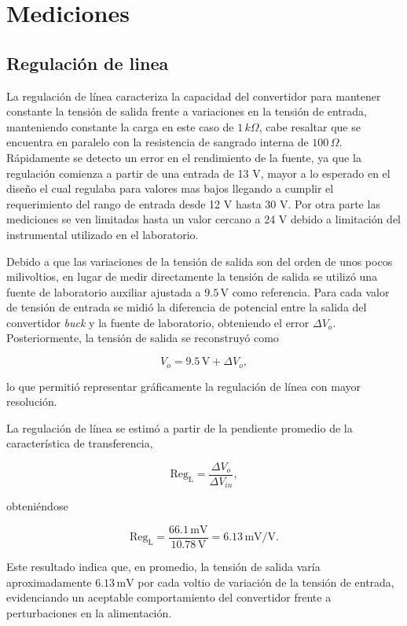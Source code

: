 \documentclass[]{article}
\begin{document}
	
	\section{Mediciones}
	
	\subsection{Regulación de linea}
	
	La regulación de línea caracteriza la capacidad del convertidor para mantener constante la tensión de salida frente a variaciones en la tensión de entrada, manteniendo constante la carga en este caso de $1 \, k\Omega$, cabe resaltar que se encuentra en paralelo con la resistencia de sangrado interna de $100\, \Omega$. Rápidamente se detecto un error en el rendimiento de la fuente, ya que la regulación comienza a partir de una entrada de 13 V, mayor a lo esperado en el diseño el cual regulaba para valores mas bajos llegando a cumplir el requerimiento del rango de entrada desde 12 V hasta 30 V. Por otra parte las mediciones se ven limitadas hasta un valor cercano a 24 V debido a limitación del instrumental utilizado en el laboratorio.
	
	
	
	Debido a que las variaciones de la tensión de salida son del orden de unos pocos milivoltios, en lugar de medir directamente la tensión de salida se utilizó una fuente de laboratorio auxiliar ajustada a $9.5\,\mathrm{V}$ como referencia. Para cada valor de tensión de entrada se midió la diferencia de potencial entre la salida del convertidor \textit{buck} y la fuente de laboratorio, obteniendo el error $\Delta V_o$. Posteriormente, la tensión de salida se reconstruyó como
	
	\[
	V_o = 9.5\,\mathrm{V} + \Delta V_o,
	\]
	
	lo que permitió representar gráficamente la regulación de línea con mayor resolución.
	
	La regulación de línea se estimó a partir de la pendiente promedio de la característica de transferencia,
	
	\[
	\mathrm{Reg}_{\mathrm{L}}=
	\frac{\Delta V_o}{\Delta V_{in}},
	\]
	
	obteniéndose
	
	\[
	\mathrm{Reg}_{\mathrm{L}}
	=
	\frac{66.1\,\mathrm{mV}}{10.78\,\mathrm{V}}
	=
	6.13\,\mathrm{mV/V}.
	\]
	
	Este resultado indica que, en promedio, la tensión de salida varía aproximadamente $6.13\,\mathrm{mV}$ por cada voltio de variación de la tensión de entrada, evidenciando un aceptable comportamiento del convertidor frente a perturbaciones en la alimentación.
	
\end{document}
